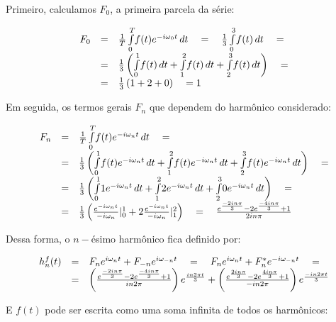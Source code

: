 Primeiro, calculamos $F_0$, a primeira parcela da série:

\[\displaystyle
\begin{array}{l c l}
  F_0 & = & \frac{1}{T} \int\limits_0^T \! f(t) e^{-i \omega_0 t} \, dt \quad = \quad \frac{1}{3} \int\limits_0^3 \! f(t) \, dt  \quad = \\
      & = & \frac{1}{3} \left( \int\limits_0^1 \! f(t) \, dt + \int\limits_1^2 \! f(t) \, dt + \int\limits_2^3 \! f(t) \, dt \right) \quad = \\
      & = & \frac{1}{3} \left( 1 + 2 + 0 \right) \quad  = 1
\end{array}
\]

Em seguida, os termos gerais $F_n$ que dependem do harmônico considerado:

\[\displaystyle
\begin{array}{l c l}
  F_n & = & \frac{1}{T} \int\limits_0^T \! f(t) e^{-i \omega_n t} \, dt \quad = \\
      & = & \frac{1}{3} \left( \int\limits_0^1 \! f(t) e^{-i \omega_n t} \, dt + \int\limits_1^2 \! f(t) e^{-i \omega_n t} \, dt + \int\limits_2^3 \! f(t) e^{-i \omega_n t} \, dt \right) \quad = \\
      & = & \frac{1}{3} \left( \int\limits_0^1 \! 1 e^{-i \omega_n t} \, dt + \int\limits_1^2 \! 2 e^{-i \omega_n t} \, dt + \int\limits_2^3 \! 0 e^{-i \omega_n t} \, dt \right) \quad = \\
      & = & \frac{1}{3} \left( \frac{e^{-i \omega_n t}}{-i \omega_n} |_0^1 + 2 \frac{e^{-i \omega_n t}}{-i \omega_n} |_1^2 \right) \quad = \quad \frac{e^{\frac{-2 i n \pi}{3}} -2 e^{\frac{-4 i n \pi}{3}} + 1}{2 i n \pi}
\end{array}
\]

Dessa forma, o $n-$ésimo harmônico fica definido por:

\[\displaystyle
\begin{array}{l c l}
  h_n^f(t) & = & F_n e^{i \omega_n t} + F_{-n} e^{i \omega_{-n} t} \quad = \quad F_n e^{i \omega_n t} + F_n^* e^{-i \omega_{-n} t} \quad = \\
         & = & \left( \frac{e^{\frac{-2 i n \pi}{3}} -2 e^{\frac{-4 i n \pi}{3}} + 1}{i n 2 \pi} \right) e^{\frac{i n 2 \pi t}{3}} + \left( \frac{e^{\frac{2 i n \pi}{3}} -2 e^{\frac{4 i n \pi}{3}} + 1}{-i n 2 \pi} \right) e^{\frac{-i n 2 \pi t}{3}}
\end{array}
\]

E $f(t)$ pode ser escrita como uma soma infinita de todos os harmônicos:

